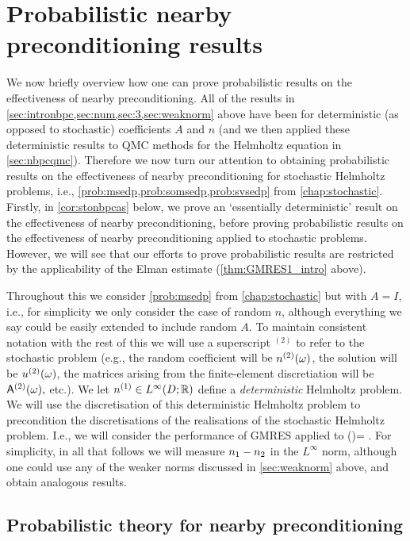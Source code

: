 \section{Probabilistic nearby preconditioning results}\label{sec:nbpcstochastic}

We now briefly overview how one can prove probabilistic results on the effectiveness of nearby preconditioning. All of the results in \cref{sec:intronbpc,sec:num,sec:3,sec:weaknorm} above have been for deterministic (as opposed to stochastic) coefficients $A$ and $n$ (and we then applied these deterministic results to QMC methods for the Helmholtz equation in \cref{sec:nbpcqmc}). Therefore we now turn our attention to obtaining probabilistic results on the effectiveness of nearby preconditioning for stochastic Helmholtz problems, i.e., \cref{prob:msedp,prob:somsedp,prob:svsedp} from \cref{chap:stochastic}. Firstly, in \cref{cor:stonbpcas} below, we prove an `essentially deterministic' result on the effectiveness of nearby preconditioning, before proving probabilistic results on the effectiveness of nearby preconditioning applied to stochastic problems. However, we will see that our efforts to prove probabilistic results are restricted by the applicability of the Elman estimate (\cref{thm:GMRES1_intro} above).

Throughout this  we consider \cref{prob:msedp} from \cref{chap:stochastic} but with $A=I$, i.e., for simplicity we only consider the case of random $n$, although everything we say could be easily extended to include random $A$. To maintain consistent notation with the rest of this  we will use a superscript ${}^{(2)}$ to refer to the stochastic problem (e.g., the random coefficient will be ${n}^{(2)}(\omega)$, the solution will be ${u}^{(2)}(\omega)$, the matrices arising from the finite-element discretiation will be $\mathsf{A}^{(2)}(\omega),$ etc.). We let $\nso \in \LiDRR$ define a \emph{deterministic} Helmholtz problem. We will use the discretisation of this deterministic Helmholtz problem to precondition the discretisations of the realisations of the stochastic Helmholtz problem. I.e., we will consider the performance of GMRES applied to
\beq\label{eq:stopc}
\AmatoI\Amatt(\omega)\uvec = \AmatoI \fvec.
\eeq
For simplicity, in all that follows we will measure $n_{1}-n_{2}$ in the $L^{\infty}$ norm, although one could use any of the weaker norms discussed in \cref{sec:weaknorm} above, and obtain analogous results.

\subsection{Probabilistic theory for nearby preconditioning}
\label{def:numGMRESitsconv}

